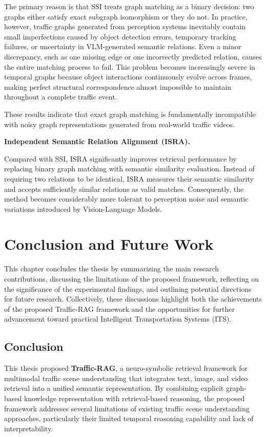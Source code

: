 \documentclass[a4paper, 11pt]{article} %
\begin{document}
The primary reason is that SSI treats graph matching as a binary decision: two graphs either satisfy exact subgraph isomorphism or they do not. In practice, however, traffic graphs generated from perception systems inevitably contain small imperfections caused by object detection errors, temporary tracking failures, or uncertainty in VLM-generated semantic relations. Even a minor discrepancy, such as one missing edge or one incorrectly predicted relation, causes the entire matching process to fail. This problem becomes increasingly severe in temporal graphs because object interactions continuously evolve across frames, making perfect structural correspondence almost impossible to maintain throughout a complete traffic event.

These results indicate that exact graph matching is fundamentally incompatible with noisy graph representations generated from real-world traffic videos.

\textbf{Independent Semantic Relation Alignment (ISRA).}

Compared with SSI, ISRA significantly improves retrieval performance by replacing binary graph matching with semantic similarity evaluation. Instead of requiring two relations to be identical, ISRA measures their semantic similarity and accepts sufficiently similar relations as valid matches. Consequently, the method becomes considerably more tolerant to perception noise and semantic variations introduced by Vision-Language Models.


\section{Conclusion and Future Work}

This chapter concludes the thesis by summarizing the main research contributions, discussing the limitations of the proposed framework, reflecting on the significance of the experimental findings, and outlining potential directions for future research. Collectively, these discussions highlight both the achievements of the proposed Traffic-RAG framework and the opportunities for further advancement toward practical Intelligent Transportation Systems (ITS).

\subsection{Conclusion}

This thesis proposed \textbf{Traffic-RAG}, a neuro-symbolic retrieval framework for multimodal traffic scene understanding that integrates text, image, and video retrieval into a unified semantic representation. By combining explicit graph-based knowledge representation with retrieval-based reasoning, the proposed framework addresses several limitations of existing traffic scene understanding approaches, particularly their limited temporal reasoning capability and lack of interpretability.
\end{document}
